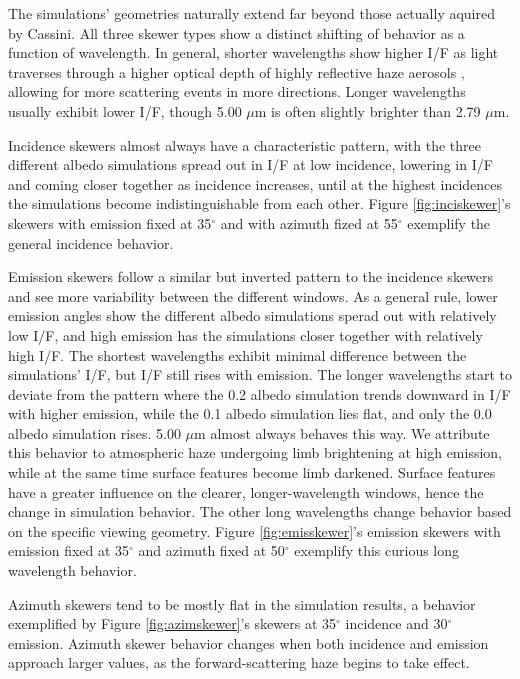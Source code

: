 \documentclass[twocolumn,linenumbers]{aastex631}
\begin{document}
The simulations' geometries naturally extend far beyond those actually aquired by Cassini. All three skewer types show a distinct shifting of behavior as a function of wavelength. In general, shorter wavelengths show higher I/F as light traverses through a higher optical depth of highly reflective haze aerosols \citep{EsSayeh2023}, allowing for more scattering events in more directions. Longer wavelengths usually exhibit lower I/F, though 5.00 $\mu$m is often slightly brighter than 2.79 $\mu$m.

Incidence skewers almost always have a characteristic pattern, with the three different albedo simulations spread out in I/F at low incidence, lowering in I/F and coming closer together as incidence increases, until at the highest incidences the simulations become indistinguishable from each other. Figure \ref{fig:inciskewer}'s skewers with emission fixed at 35$^{\circ}$ and with azimuth fized at 55$^{\circ}$ exemplify the general incidence behavior.

Emission skewers follow a similar but inverted pattern to the incidence skewers and see more variability between the different windows. As a general rule, lower emission angles show the different albedo simulations sperad out with relatively low I/F, and high emission has the simulations closer together with relatively high I/F. The shortest wavelengths exhibit minimal difference between the simulations' I/F, but I/F still rises with emission. The longer wavelengths start to deviate from the pattern where the 0.2 albedo simulation trends downward in I/F with higher emission, while the 0.1 albedo simulation lies flat, and only the 0.0 albedo simulation rises. 5.00 $\mu$m almost always behaves this way. We attribute this behavior to atmospheric haze undergoing limb brightening at high emission, while at the same time surface features become limb darkened. Surface features have a greater influence on the clearer, longer-wavelength windows, hence the change in simulation behavior. The other long wavelengths change behavior based on the specific viewing geometry. Figure \ref{fig:emisskewer}'s emission skewers with emission fixed at 35$^{\circ}$ and azimuth fixed at 50$^{\circ}$ exemplify this curious long wavelength behavior.

Azimuth skewers tend to be mostly flat in the simulation results, a behavior exemplified by Figure \ref{fig:azimskewer}'s skewers at 35$^{\circ}$ incidence and 30$^{\circ}$ emission. Azimuth skewer behavior changes when both incidence and emission approach larger values, as the forward-scattering haze begins to take effect.
\end{document}

